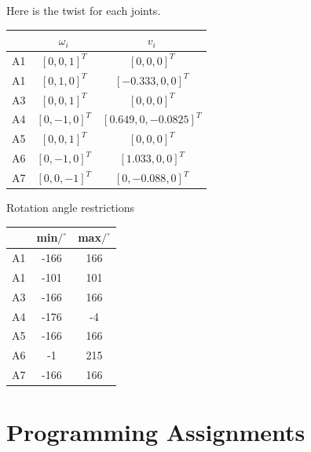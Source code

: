 \documentclass[english,10pt,a4paper]{article}
\begin{document}
    Here is the twist for each joints.
    \begin{center}
        \begin{tabular}{|c|c|c|}
            \hline
            & $\omega_i$ & $v_i$ \\
            \hline
            A1 & $[0, 0, 1]^{T}$ & $[0, 0, 0]^{T}$ \\
            \hline
            A1 & $[0, 1, 0]^{T}$ & $[-0.333, 0, 0]^{T}$ \\
            \hline
            A3 & $[0, 0, 1]^{T}$ & $[0, 0, 0]^{T}$ \\
            \hline
            A4 & $[0, -1, 0]^{T}$ & $[0.649, 0, -0.0825]^{T}$ \\
            \hline
            A5 & $[0, 0, 1]^{T}$ & $[0, 0, 0]^{T}$ \\
            \hline
            A6 & $[0, -1, 0]^{T}$ & $[1.033, 0, 0]^{T}$ \\
            \hline
            A7 & $[0, 0, -1]^{T}$ & $[0, -0.088, 0]^{T}$ \\
            \hline
        \end{tabular}
    \end{center}
    
    Rotation angle restrictions
    \begin{center}
        \begin{tabular}{|c|c|c|}
            \hline
            & min$/^\circ$& max$/^\circ$ \\
            \hline
            A1 & -166 & 166 \\
            \hline
            A1 & -101 & 101 \\
            \hline
            A3 & -166 & 166 \\
            \hline
            A4 & -176 & -4 \\
            \hline
            A5 & -166 & 166 \\
            \hline
            A6 & -1 & 215 \\
            \hline
            A7 & -166 & 166 \\
            \hline
        \end{tabular}
    \end{center}
    
    \section{Programming Assignments}
\end{document}
